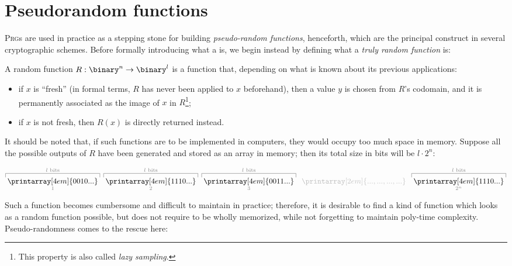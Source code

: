 \section{Pseudorandom functions}

\textsc{Prg}s are used in practice as a stepping stone for building \emph{pseudo-random functions}, \prf{} henceforth, which are the principal construct in several cryptographic schemes. Before formally introducing what a \prf{} is, we begin instead by defining what a \emph{truly random function} is:

\begin{definition}
    A random function $R : \binary^n \to \binary^l$ is a function that, depending on what is known about its previous applications:

    \begin{itemize}
        \item if $x$ is ``fresh'' (in formal terms, $R$ has never been applied to $x$ beforehand), then a value $y$ is chosen \uar{} from $R$'s codomain, and it is permanently associated as the image of $x$ in $R$\footnote{This property is also called \emph{lazy sampling}.};

        \item if $x$ is not fresh, then $R(x)$ is directly returned instead. \qedhere
    \end{itemize}
\end{definition}

It should be noted that, if such functions are to be implemented in computers, they would occupy too much space in memory. Suppose all the possible outputs of $R$ have been generated and stored as an array in memory; then its total size in bits will be $l \cdot 2^n$:

\[  
    \color{black!50}
    \overbracket[0.5pt][5pt]{\;\color{black}\printarray[4em]{0010...}\;}^{l \text{ bits}}_1\;
    \overbracket[0.5pt][5pt]{\;\color{black}\printarray[4em]{1110...}\;}^{l \text{ bits}}_2\;
    \overbracket[0.5pt][5pt]{\;\color{black}\printarray[4em]{0011...}\;}^{l \text{ bits}}_3\;\;
    \color{black!25}
    \printarray[2em]{..., ..., ..., ...}\;\;
    \color{black!50}
    \overbracket[0.5pt][5pt]{\;\color{black}\printarray[4em]{1110...}\;}^{l \text{ bits}}_{2^n}
\]

Such a function becomes cumbersome and difficult to maintain in practice; therefore, it is desirable to find a kind of function which looks as a random function possible, but does not require to be wholly memorized, while not forgetting to maintain poly-time complexity. Pseudo-randomness comes to the rescue here:

